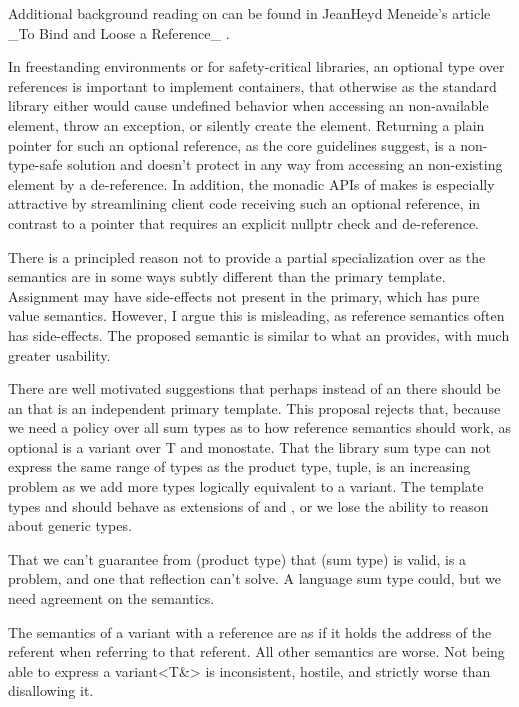 \documentclass[a4paper,10pt,oneside,openany,final,article]{memoir}
\begin{document}
Additional background reading on  can be found in JeanHeyd Meneide's article _To Bind and Loose a Reference_ \cite{REFBIND}.

In freestanding environments or for safety-critical libraries, an optional type over references is important to implement containers, that otherwise as the standard library either would cause undefined behavior when accessing an non-available element, throw an exception, or silently create the element. Returning a plain pointer for such an optional reference, as the core guidelines suggest, is a non-type-safe solution and doesn't protect in any way from accessing an non-existing element by a  de-reference. In addition, the monadic APIs of  makes is especially attractive by streamlining client code receiving such an optional reference, in contrast to a pointer that requires an explicit nullptr check and de-reference.

There is a principled reason not to provide a partial specialization over  as the semantics are in some ways subtly different than the primary template. Assignment may have side-effects not present in the primary, which has pure value semantics. However, I argue this is misleading, as reference semantics often has side-effects. The proposed semantic is similar to what an  provides, with much greater usability.

There are well motivated suggestions that perhaps instead of an  there should be an  that is an independent primary template. This proposal rejects that, because we need a policy over all sum types as to how reference semantics should work, as optional is a variant over T and monostate. That the library sum type can not express the same range of types as the product type, tuple, is an increasing problem as we add more types logically equivalent to a variant. The template types  and  should behave as extensions of  and , or we lose the ability to reason about generic types.

That we can't guarantee from  (product type) that  (sum type) is valid, is a problem, and one that reflection can't solve. A language sum type could, but we need agreement on the semantics.

The semantics of a variant with a reference are as if it holds the address of the referent when referring to that referent. All other semantics are worse. Not being able to express a variant<T\&> is inconsistent, hostile, and strictly worse than disallowing it.
\end{document}
